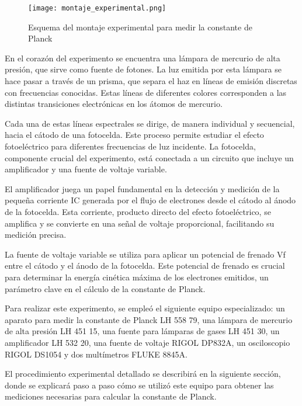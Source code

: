 \documentclass[twocolumn,a4paper,11pt]{scrartcl}
\begin{document}
\begin{figure}[h]
    \centering
    \texttt{[image: montaje\_experimental.png]}
    \caption{Esquema del montaje experimental para medir la constante de Planck}
    \label{fig:montaje}
\end{figure}

En el corazón del experimento se encuentra una lámpara de mercurio de alta presión, que sirve como fuente de fotones. La luz emitida por esta lámpara se hace pasar a través de un prisma, que separa el haz en líneas de emisión discretas con frecuencias conocidas. Estas líneas de diferentes colores corresponden a las distintas transiciones electrónicas en los átomos de mercurio.

Cada una de estas líneas espectrales se dirige, de manera individual y secuencial, hacia el cátodo de una fotocelda. Este proceso permite estudiar el efecto fotoeléctrico para diferentes frecuencias de luz incidente. La fotocelda, componente crucial del experimento, está conectada a un circuito que incluye un amplificador y una fuente de voltaje variable.

El amplificador juega un papel fundamental en la detección y medición de la pequeña corriente IC generada por el flujo de electrones desde el cátodo al ánodo de la fotocelda. Esta corriente, producto directo del efecto fotoeléctrico, se amplifica y se convierte en una señal de voltaje proporcional, facilitando su medición precisa.

La fuente de voltaje variable se utiliza para aplicar un potencial de frenado Vf entre el cátodo y el ánodo de la fotocelda. Este potencial de frenado es crucial para determinar la energía cinética máxima de los electrones emitidos, un parámetro clave en el cálculo de la constante de Planck.

Para realizar este experimento, se empleó el siguiente equipo especializado: un aparato para medir la constante de Planck LH 558 79, una lámpara de mercurio de alta presión LH 451 15, una fuente para lámparas de gases LH 451 30, un amplificador LH 532 20, una fuente de voltaje RIGOL DP832A, un osciloscopio RIGOL DS1054 y dos multímetros FLUKE 8845A.

El procedimiento experimental detallado se describirá en la siguiente sección, donde se explicará paso a paso cómo se utilizó este equipo para obtener las mediciones necesarias para calcular la constante de Planck.
\end{document}
